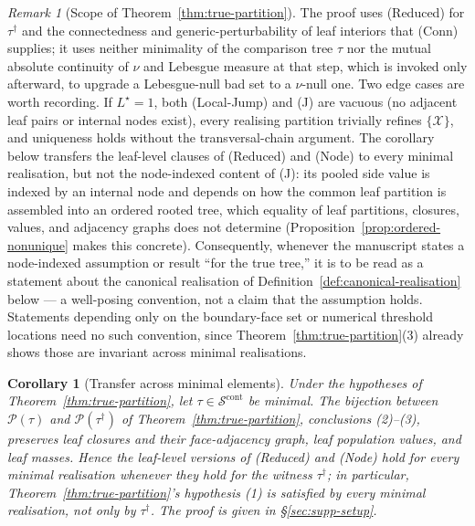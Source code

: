 \documentclass[11pt]{article}
\theoremstyle{plain}
\newtheorem{corollary}[theorem]{Corollary}
\theoremstyle{definition}
\theoremstyle{remark}
\newtheorem{remark}[theorem]{Remark}
\newcommand{\cX}{\mathcal{X}}
\newcommand{\cS}{\mathcal{S}}
\newcommand{\cP}{\mathcal{P}}
\begin{document}
\begin{remark}[Scope of Theorem~\ref{thm:true-partition}]\label{rem:uniqueness-scope}
The proof uses (Reduced) for \(\tau^{\dagger}\) and the connectedness and
generic-perturbability of leaf interiors that (Conn) supplies; it uses
neither minimality of the comparison tree \(\tau\) nor the mutual absolute
continuity of \(\nu\) and Lebesgue measure at that step, which is invoked
only afterward, to upgrade a Lebesgue-null bad set to a
\(\nu\)-null one. Two edge cases are worth recording. If \(L^\star=1\), both
(Local-Jump) and (J) are vacuous (no adjacent leaf pairs or internal nodes
exist), every realising partition trivially refines \(\{\cX\}\), and
uniqueness holds without the transversal-chain argument. The corollary
below transfers the leaf-level clauses of (Reduced) and (Node) to every
minimal realisation, but not the node-indexed content of (J): its pooled side value is indexed by an internal node and depends on how
the common leaf partition is assembled into an ordered rooted tree, which
equality of leaf partitions, closures, values, and adjacency graphs does not
determine (Proposition~\ref{prop:ordered-nonunique} makes this concrete).
Consequently, whenever the manuscript states a node-indexed assumption or
result ``for the true tree,'' it is to be read as a statement about the
canonical realisation of Definition~\ref{def:canonical-realisation} below ---
a well-posing convention, not a claim that the assumption holds. Statements
depending only on the boundary-face set or numerical threshold locations
need no such convention, since Theorem~\ref{thm:true-partition}(3) already
shows those are invariant across minimal realisations.
\end{remark}

\begin{corollary}[Transfer across minimal elements]\label{cor:minimal-transfer}
Under the hypotheses of Theorem~\ref{thm:true-partition}, let
\(\tau\in\cS^{\mathrm{cont}}\) be minimal. The bijection between
\(\cP(\tau)\) and \(\cP(\tau^{\dagger})\) of Theorem~\ref{thm:true-partition},
conclusions (2)--(3), preserves leaf closures and their face-adjacency
graph, leaf population values, and leaf masses. Hence the leaf-level
versions of (Reduced) and (Node) hold for every minimal realisation
whenever they hold for the witness \(\tau^{\dagger}\); in particular,
Theorem~\ref{thm:true-partition}'s hypothesis (1) is satisfied by every
minimal realisation, not only by \(\tau^{\dagger}\). The proof is given in
\S\ref{sec:supp-setup}.
\end{corollary}
\end{document}
